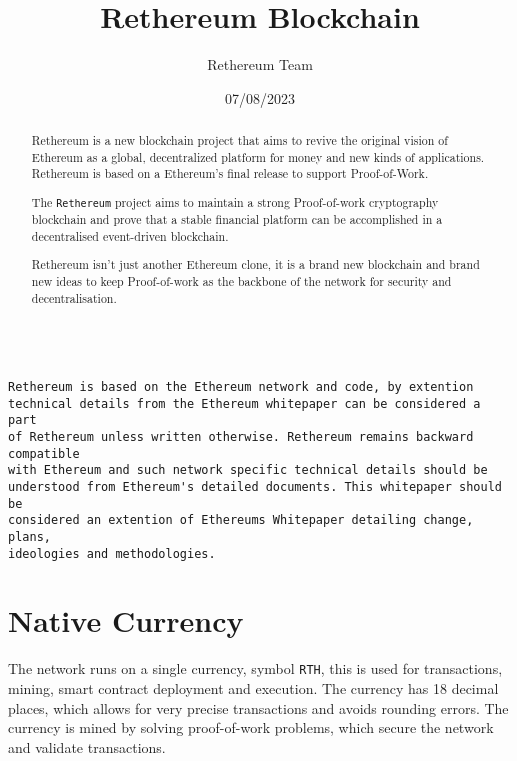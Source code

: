 \documentclass[a4paper,onecolumn, superscriptaddress,10pt,accepted=2020-05-01,issue=1, volume=2, shorttitle=papers]{compositionalityarticle}
\begin{document}
\title{Rethereum Blockchain}
\date{07/08/2023}
\author{Rethereum Team}

\maketitle

\begin{abstract}
     Rethereum is a new blockchain project that aims to revive the original vision of Ethereum as a global, decentralized platform for money and new kinds of applications. Rethereum is based on a Ethereum's final release to support Proof-of-Work.
     
     The \texttt{Rethereum} project aims to maintain a strong Proof-of-work cryptography blockchain and prove that  a stable financial platform can be accomplished in a decentralised event-driven blockchain.
    
    Rethereum isn't just another Ethereum clone, it is a brand new blockchain and brand new ideas to keep Proof-of-work as the backbone of the network for security and decentralisation. 
    
\end{abstract}

\vspace{10cm}

\begin{verbatim}

Rethereum is based on the Ethereum network and code, by extention 
technical details from the Ethereum whitepaper can be considered a part 
of Rethereum unless written otherwise. Rethereum remains backward compatible 
with Ethereum and such network specific technical details should be 
understood from Ethereum's detailed documents. This whitepaper should be 
considered an extention of Ethereums Whitepaper detailing change, plans, 
ideologies and methodologies.
\end{verbatim}


\newpage

\section{Native Currency}

The network runs on a single currency, symbol \texttt{RTH}, this is used for transactions, mining, smart contract deployment and execution. The currency has 18 decimal places, which allows for very precise transactions and avoids rounding errors. The currency is mined by solving proof-of-work problems, which secure the network and validate transactions. 
\end{document}

